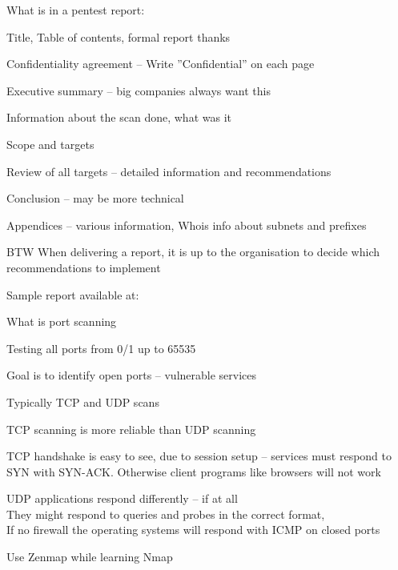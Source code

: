 \documentclass[Screen16to9,17pt]{foils}
\begin{document}

\begin{list1}
\item What is in a pentest report:
\begin{list2}
\item Title, Table of contents, formal report thanks
\item Confidentiality agreement – Write ”Confidential” on each page
\item Executive summary – big companies always want this
\item Information about the scan done, what was it
\item Scope and targets
\item Review of all targets – detailed information and recommendations
\item Conclusion – may be more technical
\item Appendices – various information, Whois info about subnets and prefixes
\end{list2}
\item BTW When delivering a report, it is up to the organisation to decide which recommendations to implement
\end{list1}

Sample report available at: 



\begin{list1}
\item What is port scanning
\begin{list2}
\item Testing all ports from 0/1 up to 65535
\item Goal is to identify open ports -- vulnerable services
\item Typically TCP and UDP scans
\item TCP scanning is more reliable than UDP scanning
\item TCP handshake is easy to see, due to session setup -- services must respond to SYN with SYN-ACK. Otherwise client programs like browsers will not work
\item UDP applications respond differently -- if at all\\
They might respond to queries and probes in the correct format, \\
If no firewall the operating systems will respond with ICMP on closed ports
\item Use Zenmap while learning Nmap
\end{list2}
\end{list1}
\end{document}
